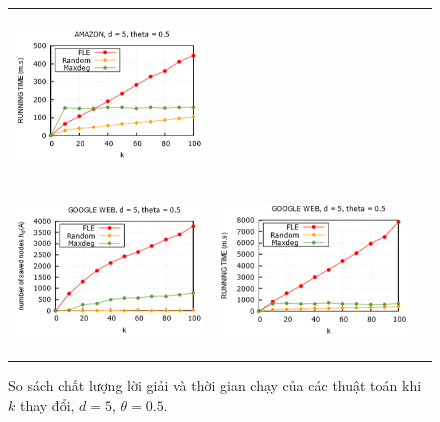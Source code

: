 \begin{figure}[H]
\begin{tabular}{lll}
		\includegraphics[height = 4.4cm]{picture/FLE/amazon_time} 
		\\
		\includegraphics[height = 4.4cm]{picture/FLE/google_res} &
		\includegraphics[height = 4.4cm]{picture/FLE/google_time} 
	\end{tabular}
	\caption{So sách chất lượng lời giải và thời gian chạy của các thuật toán khi $k$ thay đổi, $d=5$, $\theta=0.5$.} 
	\label{fig:FLE_k}   
\end{figure}

